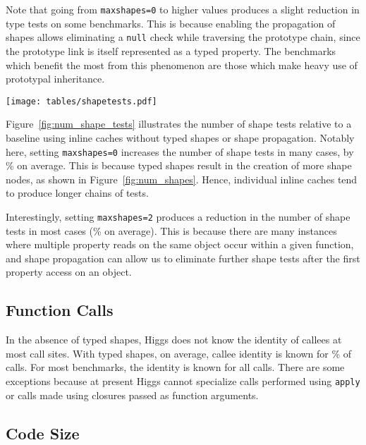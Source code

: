\documentclass[preprint]{sigplanconf}
\newcommand{\percentstat}[1]{\unskip\%}
\begin{document}
Note that going from {\tt maxshapes=0} to higher values produces a
slight reduction in type tests on some benchmarks. This is because enabling
the propagation of shapes allows eliminating a {\tt null} check while
traversing the prototype chain, since the prototype link is itself represented
as a typed property. The benchmarks which benefit the most from this phenomenon
are those which make heavy use of prototypal inheritance.

\begin{figure*}[tb]
    \begin{center}
    \texttt{[image: tables/shapetests.pdf]}
    \end{center}
\caption{Number of shape tests relative to inline cache baseline\label{fig:num_shape_tests}}
\end{figure*}

Figure~\ref{fig:num_shape_tests} illustrates the number of shape tests relative
to a baseline using inline caches without typed shapes or shape propagation.
Notably here, setting {\tt maxshapes=0} increases the number of
shape tests in many cases, by \percentstat{shapetests_incr_maxshapes0} on
average. This is because typed shapes result in the creation of more shape
nodes, as shown in Figure~\ref{fig:num_shapes}. Hence, individual inline
caches tend to produce longer chains of tests.

Interestingly, setting {\tt maxshapes=2} produces a reduction in the
number of shape tests in most cases
(\percentstat{shapetests_decr_maxshapes2} on average). This is because there
are many instances where multiple property reads on the same object occur
within a given function, and shape propagation can allow us to eliminate
further shape tests after the first property access on an object.

\subsection{Function Calls}



In the absence of typed shapes, Higgs does not know the identity of callees at
most call sites. With typed shapes, on average, callee identity is known for
\percentstat{callknown_mean_fast_calls} of calls. For most benchmarks, the
identity is known for all calls. There are some exceptions because at
present Higgs cannot specialize calls performed using {\tt apply} or calls
made using closures passed as function arguments.

\subsection{Code Size}
\end{document}
